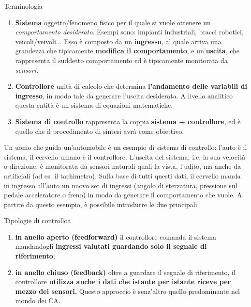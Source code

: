 \documentclass[a4paper]{report}
\begin{document}
\begin{defin}{Terminologia}{}
	\begin{enumerate}
		\item \textbf{Sistema} \rarr oggetto/fenomeno fisico per il quale si vuole ottenere un \textit{comportamento desiderato}. Esempi sono: impianti industriali, bracci robotici, veicoli/veivoli... Esso è composto da un \textbf{ingresso}, al quale arriva una grandezza che tipicamente \textbf{modifica il comportamento}, e un'\textbf{uscita}, che rappresenta il suddetto comportamento ed è tipicamente monitorata da \textit{sensori.}
		\item  \textbf{Controllore} \rarr unità di calcolo che determina \textbf{l'andamento delle variabili di ingresso}, in modo tale da generare l'uscita desiderata. A livello analitico questa entità è un sistema di equazioni matematiche.
		\item \textbf{Sistema di controllo} \rarr rappresenta la coppia \textbf{sistema + controllore}, ed è quello che il procedimento di sintesi avrà come obiettivo. 
	\end{enumerate}
\end{defin}


\bb


Un uomo che guida un'automobile è un esempio di sistema di controllo: l'auto è il sistema, il cervello umano è il controllore. L'uscita del sistema, i.e. la sua velocità o direzione, è monitorata da sensori naturali quali la vista, l'udito, ma anche da artificiali (ad es. il tachimetro). Sulla base di tutti questi dati, il cervello manda in ingresso all'auto un nuovo set di ingressi (angolo di sterzatura, pressione sul pedale acceleratore o freno) in modo da generare il comportamento che vuole.
\newpage
A partire da questo esempio, è possibile introdurre le due principali

\begin{defin}{Tipologie di controllo}{a}
\begin{enumerate}
	\item \textbf{in anello aperto (feedforward)} \rarr il controllore comanda il sistema mandandogli \textbf{ingressi valutati guardando solo il segnale di riferimento};
	\item \textbf{in anello chiuso (feedback)} \rarr oltre a guardare il segnale di riferimento, il controllore \textbf{utilizza anche i dati che istante per istante riceve per mezzo dei sensori.} Questo approccio è senz'altro quello predominante nel mondo dei CA.
\end{enumerate}
\end{defin}
\end{document}
